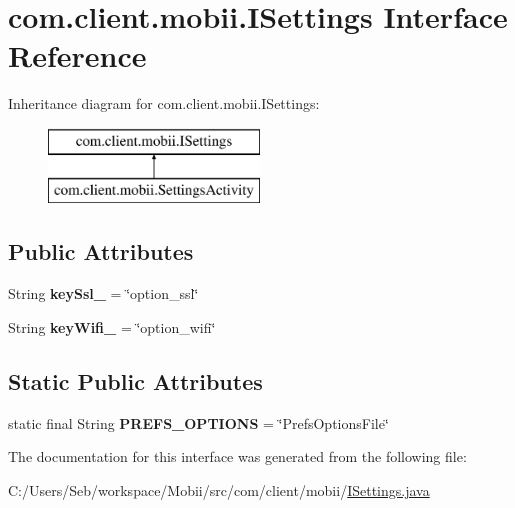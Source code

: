 \hypertarget{interfacecom_1_1client_1_1mobii_1_1_i_settings}{\section{com.\-client.\-mobii.\-I\-Settings Interface Reference}
\label{interfacecom_1_1client_1_1mobii_1_1_i_settings}
}
Inheritance diagram for com.\-client.\-mobii.\-I\-Settings\-:\begin{figure}[H]
\begin{center}
\leavevmode
\includegraphics[height=2.000000cm]{interfacecom_1_1client_1_1mobii_1_1_i_settings}
\end{center}
\end{figure}
\subsection*{Public Attributes}
\begin{DoxyCompactItemize}
\item 
\hypertarget{interfacecom_1_1client_1_1mobii_1_1_i_settings_a8deeea1a784a3de7b1787175cd9ab008}{String {\bfseries key\-Ssl\-\_\-} = \char`\"{}option\-\_\-ssl\char`\"{}}\label{interfacecom_1_1client_1_1mobii_1_1_i_settings_a8deeea1a784a3de7b1787175cd9ab008}

\item 
\hypertarget{interfacecom_1_1client_1_1mobii_1_1_i_settings_ac0e6f4ffaf7a2d90a76e766f1fb68c0e}{String {\bfseries key\-Wifi\-\_\-} = \char`\"{}option\-\_\-wifi\char`\"{}}\label{interfacecom_1_1client_1_1mobii_1_1_i_settings_ac0e6f4ffaf7a2d90a76e766f1fb68c0e}

\end{DoxyCompactItemize}
\subsection*{Static Public Attributes}
\begin{DoxyCompactItemize}
\item 
\hypertarget{interfacecom_1_1client_1_1mobii_1_1_i_settings_ab81da5d78232420bd43490d94baefd17}{static final String {\bfseries P\-R\-E\-F\-S\-\_\-\-O\-P\-T\-I\-O\-N\-S} = \char`\"{}Prefs\-Options\-File\char`\"{}}\label{interfacecom_1_1client_1_1mobii_1_1_i_settings_ab81da5d78232420bd43490d94baefd17}

\end{DoxyCompactItemize}


The documentation for this interface was generated from the following file\-:\begin{DoxyCompactItemize}
\item 
C\-:/\-Users/\-Seb/workspace/\-Mobii/src/com/client/mobii/\hyperlink{_i_settings_8java}{I\-Settings.\-java}\end{DoxyCompactItemize}
